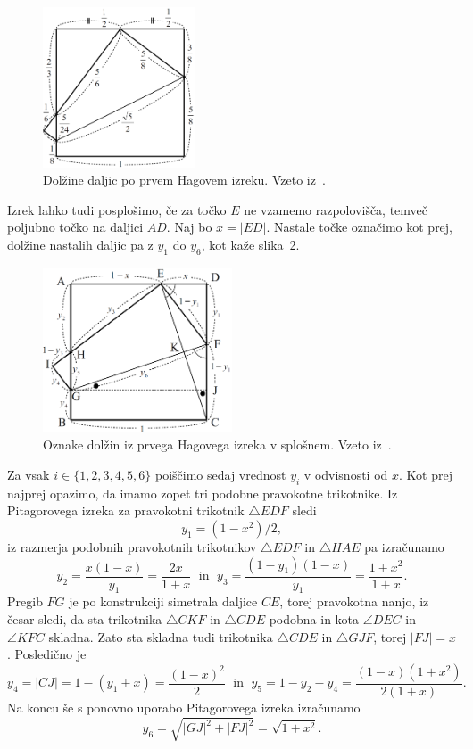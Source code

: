 \begin{figure}[h]
    \centering
    \includegraphics[width=0.4\textwidth]{images/hagovi_izreki/hagov_izrek1_stevilke.png}
    \caption[Prvi Hagov izrek v številkah]{Dolžine daljic po prvem Hagovem izreku. Vzeto iz~\cite[str. 7]{haga2008}.}
    \label{fig:hagov_izrek1_st}
\end{figure}

Izrek lahko tudi posplošimo, če za točko $E$ ne vzamemo razpolovišča, temveč poljubno točko na daljici $AD$. Naj bo $x = |ED|$. Nastale točke označimo kot prej, dolžine nastalih daljic pa z $y_1$ do $y_6$, kot kaže slika~\ref{fig:hagov_izrek1_splosen}.

\begin{figure}[h]
    \centering
    \includegraphics[width=0.5\textwidth]{images/hagovi_izreki/hagov_izrek1_splosen.png}
    \caption[Prvi Hagov izrek v splošnem]{Oznake dolžin iz prvega Hagovega izreka v splošnem. Vzeto iz~\cite[str. 9]{haga2008}.}
    \label{fig:hagov_izrek1_splosen}
\end{figure}

Za vsak $i \in \{1,2,3,4,5,6\}$ poiščimo sedaj vrednost $y_i$ v odvisnosti od $x$. Kot prej najprej opazimo, da imamo zopet tri podobne pravokotne trikotnike. Iz Pitagorovega izreka za pravokotni trikotnik $\triangle EDF$ sledi
$$y_1 = (1-x^2)/2,$$
iz razmerja podobnih pravokotnih trikotnikov $\triangle EDF$ in $\triangle HAE$ pa izračunamo
$$ y_2 = \frac{x(1-x)}{y_1} = \frac{2x}{1+x} \; \text{ in } \; y_3 = \frac{(1-y_1)(1-x)}{y_1} = \frac{1+x^2}{1+x}.$$
Pregib $FG$ je po konstrukciji simetrala daljice $CE$, torej pravokotna nanjo, iz česar sledi, da sta trikotnika $\triangle CKF$ in $\triangle CDE$ podobna in kota $\angle DEC$ in $\angle KFC$ skladna. Zato sta skladna tudi trikotnika $\triangle CDE$ in $\triangle GJF$, torej $|FJ| = x$. Posledično je
$$y_4 = |CJ| = 1 - (y_1 + x) = \frac{(1-x)^2}{2} \; \text{ in } \; y_5 = 1 - y_2 - y_4 = \frac{(1-x)(1+x^2)}{2(1+x)}.$$
Na koncu še s ponovno uporabo Pitagorovega izreka izračunamo
$$ y_6 = \sqrt{|GJ|^2 + |FJ|^2} = \sqrt{1 + x^2}.$$

